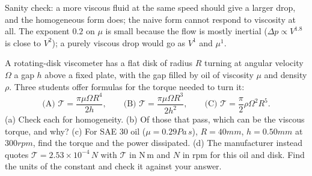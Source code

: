 Sanity check: a more viscous fluid at the same speed should give a larger drop, and the homogeneous form does; the naive form cannot respond to viscosity at all. The exponent $0.2$ on $\mu$ is small because the flow is mostly inertial ($\Delta p \propto V^{1.8}$ is close to $V^2$); a purely viscous drop would go as $V^1$ and $\mu^1$.

\begin{example}
A rotating-disk viscometer has a flat disk of radius $R$ turning at angular velocity $\Omega$ a gap $h$ above a fixed plate, with the gap filled by oil of viscosity $\mu$ and density $\rho$. Three students offer formulas for the torque needed to turn it:
\[
\text{(A) } \mathcal{T} = \frac{\pi \mu \Omega R^4}{2h}, \qquad
\text{(B) } \mathcal{T} = \frac{\pi \mu \Omega R^3}{2h^2}, \qquad
\text{(C) } \mathcal{T} = \frac{\pi}{2}\rho \Omega^2 R^5 .
\]
(a) Check each for homogeneity. (b) Of those that pass, which can be the viscous torque, and why? (c) For SAE 30 oil ($\mu = 0.29\unit{Pa\,s}$), $R = 40\unit{mm}$, $h = 0.50\unit{mm}$ at $300\unit{rpm}$, find the torque and the power dissipated. (d) The manufacturer instead quotes $\mathcal{T} = 2.53 \times 10^{-4}\, N$ with $\mathcal{T}$ in N\,m and $N$ in rpm for this oil and disk. Find the units of the constant and check it against your answer.
\end{example}

